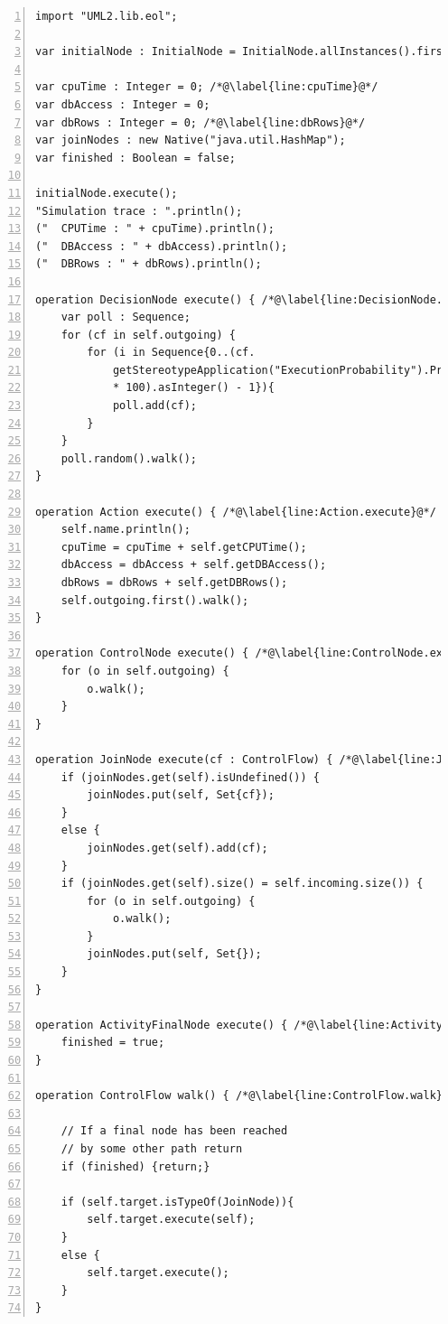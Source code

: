 \begin{lstlisting}[basicstyle=\ttfamily\footnotesize, flexiblecolumns=true, numbers=left, nolol=true, caption=Simulation using EOL, label=lst:SAP.EOL, language=EOL, tabsize=2]
import "UML2.lib.eol";

var initialNode : InitialNode = InitialNode.allInstances().first();

var cpuTime : Integer = 0; /*@\label{line:cpuTime}@*/
var dbAccess : Integer = 0;
var dbRows : Integer = 0; /*@\label{line:dbRows}@*/
var joinNodes : new Native("java.util.HashMap");
var finished : Boolean = false;

initialNode.execute();
"Simulation trace : ".println();
("	CPUTime : " + cpuTime).println();
("	DBAccess : " + dbAccess).println();
("	DBRows : " + dbRows).println();

operation DecisionNode execute() { /*@\label{line:DecisionNode.execute}@*/
	var poll : Sequence;
	for (cf in self.outgoing) {
		for (i in Sequence{0..(cf.
			getStereotypeApplication("ExecutionProbability").Probability 
			* 100).asInteger() - 1}){
			poll.add(cf);
		}
	}
	poll.random().walk();
}

operation Action execute() { /*@\label{line:Action.execute}@*/
	self.name.println();
	cpuTime = cpuTime + self.getCPUTime();
	dbAccess = dbAccess + self.getDBAccess();
	dbRows = dbRows + self.getDBRows();
	self.outgoing.first().walk();
}

operation ControlNode execute() { /*@\label{line:ControlNode.execute}@*/
	for (o in self.outgoing) {
		o.walk();
	}
}

operation JoinNode execute(cf : ControlFlow) { /*@\label{line:JoinNode.execute}@*/
	if (joinNodes.get(self).isUndefined()) {
		joinNodes.put(self, Set{cf});
	}
	else {
		joinNodes.get(self).add(cf);
	}
	if (joinNodes.get(self).size() = self.incoming.size()) {
		for (o in self.outgoing) {
			o.walk();
		}
		joinNodes.put(self, Set{});
	}
}

operation ActivityFinalNode execute() { /*@\label{line:ActivityFinalNode.execute}@*/
	finished = true;
}

operation ControlFlow walk() { /*@\label{line:ControlFlow.walk}@*/
	
	// If a final node has been reached
	// by some other path return
	if (finished) {return;}

	if (self.target.isTypeOf(JoinNode)){
		self.target.execute(self);
	}
	else {
		self.target.execute();
	}
}
\end{lstlisting}

